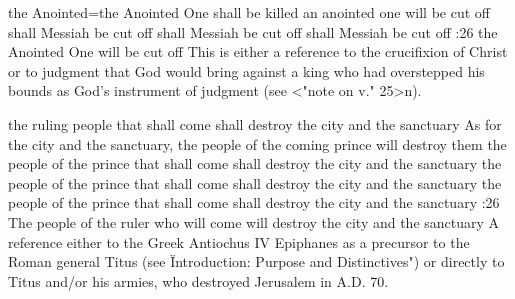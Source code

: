     {the Anointed}={the Anointed One shall be killed} %
    {an anointed one will be cut off} %
    {shall Messiah be cut off} %
    {shall Messiah be cut off} %
    {shall Messiah be cut off} %
:26 {the Anointed One will be cut off} This is either a reference to the crucifixion of Christ or to judgment that God would bring against a king who had overstepped his bounds as God's instrument of judgment (see <"note on v." 25>n).

    {the ruling people that shall come shall destroy the city and the sanctuary} %
    {As for the city and the sanctuary, the people of the coming prince will destroy them} %
    {the people of the prince that shall come shall destroy the city and the sanctuary} %
    {the people of the prince that shall come shall destroy the city and the sanctuary} %
    {the people of the prince that shall come shall destroy the city and the sanctuary} %
:26 {The people of the ruler  who will come will destroy the city and the sanctuary} A reference either to the Greek Antiochus IV Epiphanes as a precursor  
to the Roman general Titus (see \"Introduction: Purpose and Distinctives") or directly to Titus and/or his armies, who destroyed  Jerusalem in A.D. 70. 

